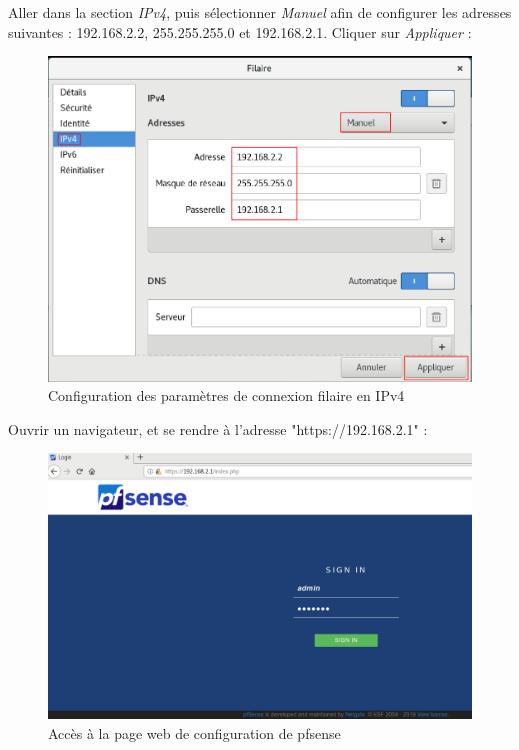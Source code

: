 \pagebreak
Aller dans la section \textit{IPv4}, puis sélectionner \textit{Manuel} afin de configurer les adresses suivantes : 192.168.2.2, 255.255.255.0 et 192.168.2.1. Cliquer sur \textit{Appliquer} :
  \begin{figure}[h!]
     \begin{center}
         \includegraphics[scale=0.5]{Debian_screenshots/Config/5.png}
         \caption{Configuration des paramètres de connexion filaire en IPv4}
         \label{Debian_screenshots/Config/5}
     \end{center}
  \end{figure}
  \FloatBarrier
     
Ouvrir un navigateur, et se rendre à l'adresse "https://192.168.2.1" :
  \begin{figure}[h!]
     \begin{center}
         \includegraphics[scale=0.4]{Debian_screenshots/Config/6.png}
         \caption{Accès à la page web de configuration de pfsense}
         \label{Debian_screenshots/Config/6}
     \end{center}
  \end{figure}
  \FloatBarrier

